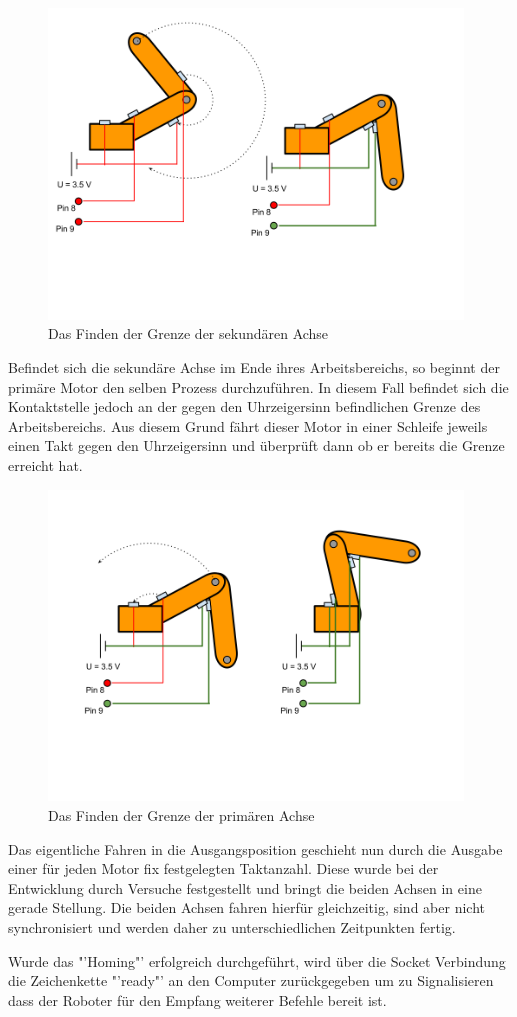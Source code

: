 \begin{figure}[H]
\centering
\includegraphics[width=11cm]{images/Homing}
\caption{Das Finden der Grenze der sekundären Achse}
\end{figure}

Befindet sich die sekundäre Achse im Ende ihres Arbeitsbereichs, so beginnt der primäre Motor den selben Prozess durchzuführen. In diesem Fall befindet sich die Kontaktstelle jedoch an der gegen den Uhrzeigersinn befindlichen Grenze des Arbeitsbereichs. Aus diesem Grund fährt dieser Motor in einer Schleife jeweils einen Takt gegen den Uhrzeigersinn und überprüft dann ob er bereits die Grenze erreicht hat.

\begin{figure}[H]
\centering
\includegraphics[width=11cm]{images/Homing2}
\caption{Das Finden der Grenze der primären Achse}
\end{figure}

Das eigentliche Fahren in die Ausgangsposition geschieht nun durch die Ausgabe einer für jeden Motor fix festgelegten Taktanzahl. Diese wurde bei der Entwicklung durch Versuche festgestellt und bringt die beiden Achsen in eine gerade Stellung. Die beiden Achsen fahren hierfür gleichzeitig, sind aber nicht synchronisiert und werden daher zu unterschiedlichen Zeitpunkten fertig. 

Wurde das "'Homing"' erfolgreich durchgeführt, wird über die Socket Verbindung die Zeichenkette "'ready"' an den Computer zurückgegeben um zu Signalisieren dass der Roboter für den Empfang weiterer Befehle bereit ist.

